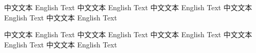 \documentclass{neocv}
\begin{document}
\section{}
中文文本 English Text 中文文本 English Text 中文文本 English Text 中文文本 English Text 中文文本 English Text 

中文文本 English Text 中文文本 English Text 中文文本 English Text 中文文本 English Text 中文文本 English Text 

\newpage

\section{}

\section{}

\section{}

\section{}

\end{document}
